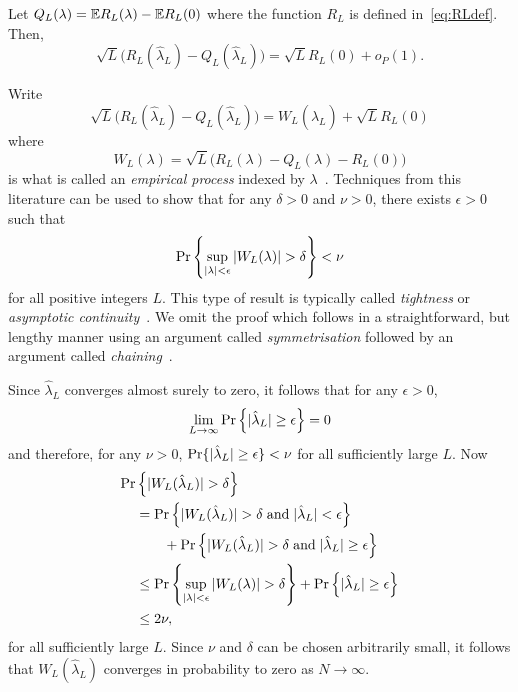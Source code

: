\documentclass[journal]{IEEEtran}
\begin{document}
\begin{lemma}\label{lem:empiricprocc} Let $Q_L(\lambda) = {\mathbb E} R_L(\lambda) - {\mathbb E} R_L(0)$ where the function $R_L$ is defined in~\eqref{eq:RLdef}.  Then,
\[
\sqrt{L}\big( R_L(\hat{\lambda}_L) - Q_L(\hat{\lambda}_L) \big) = \sqrt{L} R_L(0) + o_P(1).
\]
\end{lemma}
\begin{IEEEproof}
Write
\[
\sqrt{L}\big( R_L(\hat{\lambda}_L) - Q_L(\hat{\lambda}_L) \big) = W_L(\hat{\lambda}_L) + \sqrt{L} R_L(0)
\]
where
\begin{equation}\label{eq:WLdef}
W_L(\lambda) = \sqrt{L}\big( R_L(\lambda) - Q_L(\lambda) - R_L(0) \big)
\end{equation}
is what is called an \emph{empirical process} indexed by $\lambda$~\cite{Pollard_asymp_empi_proc_1989,Pollard_new_ways_clts_1986,van2009empirical,Pollard_conv_stat_proc_1984}.  Techniques from this literature can be used to show that
for any $\delta > 0$ and $\nu > 0$, there exists $\epsilon > 0$ such that
\[
\Pr\left\{ \sup_{{\vert \lambda \vert}<\epsilon}{\vert W_L(\lambda) \vert} > \delta  \right\} < \nu
\]
for all positive integers $L$.  This type of result is typically called \emph{tightness} or \emph{asymptotic continuity}~\cite{Pollard_asymp_empi_proc_1989,van2009empirical,Billingsley1999_convergence_of_probability_measures}.  We omit the proof which follows in a straightforward, but lengthy manner using an argument called \emph{symmetrisation} followed by an argument called \emph{chaining}~\cite{Pollard_asymp_empi_proc_1989,van2009empirical}.

Since $\hat{\lambda}_L$ converges almost surely to zero, it follows that for any $\epsilon > 0$,
\[
\lim_{L\rightarrow\infty}{\operatorname{Pr}}\left\{ {\vert \hat{\lambda}_L \vert} \geq \epsilon \right\} = 0
\] 
and therefore, for any $\nu > 0$, ${\operatorname{Pr}}\{ {\vert \hat{\lambda}_L \vert} \geq \epsilon \} < \nu$ for all sufficiently large $L$.  Now
\begin{align*}
  {\operatorname{Pr}}&\left\{{\vert  W_L(\hat{\lambda}_L)  \vert} > \delta \right\} \\
&= {\operatorname{Pr}}\left\{ {\vert W_L(\hat{\lambda}_L) \vert} > \delta \;\text{and} \; {\vert \hat{\lambda}_L \vert} < \epsilon \right\} \\
&\hspace{0.7cm} + {\operatorname{Pr}}\left\{ {\vert W_L(\hat{\lambda}_L) \vert} > \delta  \;\text{and} \; {\vert \hat{\lambda}_L \vert} \geq \epsilon \right\} \\
&\leq {\operatorname{Pr}}\left\{  \sup_{{\vert \lambda \vert} < \epsilon} {\vert  W_L(\lambda)  \vert} > \delta \right\} + {\operatorname{Pr}}\left\{ {\vert \hat{\lambda}_L \vert} \geq \epsilon \right\} \\
&\leq 2\nu,
\end{align*}
for all sufficiently large $L$.  Since $\nu$ and $\delta$ can be chosen arbitrarily small, it follows that $W_L(\hat{\lambda}_L)$ converges in probability to zero as $N\rightarrow\infty$.
\end{IEEEproof}
\end{document}
